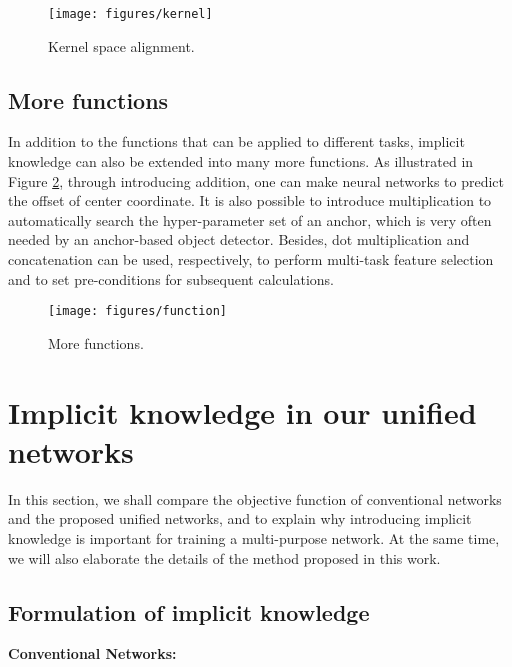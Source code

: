 \documentclass[10pt,twocolumn,letterpaper]{article}
\begin{document}
\newpage

\begin{figure}[h]
	\begin{center}
		\texttt{[image: figures/kernel]}
	\end{center}
	\caption{Kernel space alignment.}
	\label{fig:ker}
\end{figure}

\subsection{More functions}

In addition to the functions that can be applied to different tasks, implicit knowledge can also be extended into many more functions.  As illustrated in Figure \ref{fig:func}, through introducing addition, one can make neural networks to predict the offset of center coordinate.  It is also possible to introduce multiplication to automatically search the hyper-parameter set of an anchor, which is very often needed by an anchor-based object detector.  Besides, dot multiplication and concatenation can be used, respectively, to perform multi-task feature selection and to set pre-conditions for subsequent calculations.

\begin{figure}[h]
	\begin{center}
		\texttt{[image: figures/function]}
	\end{center}
	\caption{More functions.}
	\label{fig:func}
\end{figure}

\newpage

\section{Implicit knowledge in our unified networks}

In this section, we shall compare the objective function of conventional networks and the proposed unified networks, and to explain why introducing implicit knowledge is important for training a multi-purpose network.  At the same time, we will also elaborate the details of the method proposed in this work.

\subsection{Formulation of implicit knowledge}
\label{sec:fik}

\noindent
\textbf{Conventional Networks:}
\end{document}
